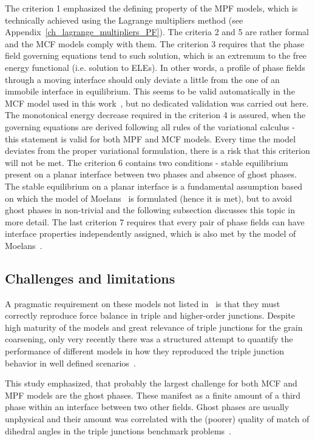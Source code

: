 	The criterion 1 emphasized the defining property of the MPF models, which is technically achieved using the Lagrange multipliers method (see Appendix~\ref{ch_lagrange_multipliers_PF}). The criteria 2 and 5 are rather formal and the MCF models comply with them. The criterion 3 requires that the phase field governing equations tend to such solution, which is an extremum to the free energy functional (i.e. solution to ELEs). In other words, a profile of phase fields through a moving interface should only deviate a little from the one of an immobile interface in equilibrium. This seems to be valid automatically in the MCF model used in this work~\cite{Moelans2008}, but no dedicated validation was carried out here. The monotonical energy decrease required in the criterion 4 is assured, when the governing equations are derived following all rules of the variational calculus - this statement is valid for both MPF and MCF models. Every time the model deviates from the proper variational formulation, there is a risk that this criterion will not be met. The criterion 6 contains two conditions - stable equilibrium present on a planar interface between two phases and absence of ghost phases. The stable equilibrium on a planar interface is a fundamental assumption based on which the model of Moelans~\cite{Moelans2008, Minar2022} is formulated (hence it is met), but to avoid ghost phases in non-trivial and the following subsection discusses this topic in more detail. The last criterion 7 requires that every pair of phase fields can have interface properties independently assigned, which is also met by the model of Moelans~\cite{Moelans2008}.

	\subsection{Challenges and limitations}
	A pragmatic requirement on these models not listed in~\cite{Toth2015} is that they must correctly reproduce force balance in triple and higher-order junctions. Despite high maturity of the models and great relevance of triple junctions for the grain coarsening, only very recently there was a structured attempt to quantify the performance of different models in how they reproduced the triple junction behavior in well defined scenarios~\cite{Daubner2023}. 
	
	This study emphasized, that probably the largest challenge for both MCF and MPF models are the ghost phases. These manifest as a finite amount of a third phase within an interface between two other fields. Ghost phases are usually unphysical and their amount was correlated with the (poorer) quality of match of dihedral angles in the triple junctions benchmark problems~\cite{Daubner2023}. 
	
